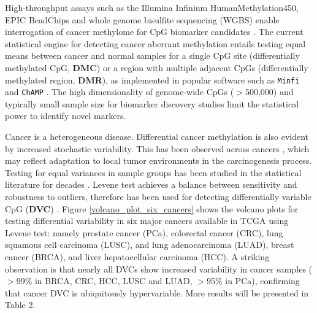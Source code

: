 \documentclass{statsoc}
\begin{document}

High-throughput assays such as the Illumina Infinium HumanMethylation450, EPIC BeadChips and whole genome bisulfite sequencing (WGBS) enable interrogation of cancer methylome for CpG biomarker candidates \citep{Hao2017}. The current statistical engine for detecting cancer aberrant methylation entails testing equal means between cancer and normal samples for a single CpG site (differentially methylated CpG, {\bf DMC}) or a region with multiple adjacent CpGs (differentially methylated region, {\bf DMR}), as implemented in popular software such as \texttt{Minfi} \citep{Aryee2014} and \texttt{ChAMP} \citep{Morris2014}. The high dimensionality of genome-wide CpGs ($>$500,000) and typically small sample size for biomarker discovery studies limit the statistical power to identify novel markers.

Cancer is a heterogeneous disease. Differential cancer methylation is also evident by increased stochastic variability. This has been observed across cancers \citep{Hansen2011,Phipson2014}, which may reflect adaptation to local tumor environments in the carcinogenesis process. Testing for equal variances in sample groups has been studied in the statistical literature for decades \citep{Brown1974}. Levene test achieves a balance between sensitivity and robustness to outliers, therefore has been used for detecting differentially variable CpG ({\bf DVC}) \citep{Phipson2014}.  Figure \ref{volcano_plot_six_cancers}  shows the volcano plots for testing differential variability in six major cancers available in TCGA using Levene test: namely prostate cancer (PCa),  colorectal cancer (CRC), lung squamous cell carcinoma (LUSC), and lung adenocarcinoma (LUAD),  breast cancer (BRCA), and liver hepatocellular carcinoma (HCC). A striking observation is that nearly all DVCs show increased variability in cancer samples ($>$99\% in BRCA, CRC, HCC, LUSC and LUAD, $>$95\% in PCa), confirming that cancer DVC is ubiquitously hypervariable. More results will be presented in Table 2. %
\end{document}
